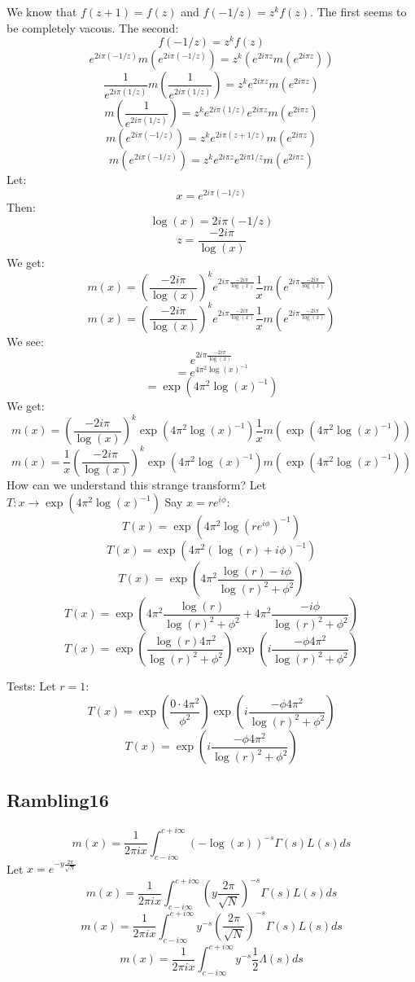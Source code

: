 \documentclass[a4paper]{amsart}
\begin{document}
We know that $f(z + 1) = f(z)$ and $f(-1/z) = z^kf(z)$. The first seems to be completely vacous. The second:
$$f(-1/z) = z^kf(z)$$
$$e^{2i\pi (-1/z)} m\left(e^{2i\pi (-1/z)}\right) = z^k(e^{2i\pi z} m(e^{2i\pi z}))$$
$$\frac{1}{e^{2i\pi (1/z)}} m\left(\frac{1}{e^{2i\pi (1/z)}}\right) = z^k e^{2i\pi z} m(e^{2i\pi z})$$
$$m\left(\frac{1}{e^{2i\pi (1/z)}}\right) = z^k e^{2i\pi (1/z)} e^{2i\pi z} m(e^{2i\pi z})$$
$$m\left(e^{2i\pi (-1/z)}\right) = z^k e^{2i\pi (z + 1/z)} m(e^{2i\pi z})$$
$$m\left(e^{2i\pi (-1/z)}\right) = z^k e^{2i\pi z} e^{2i\pi 1/z} m(e^{2i\pi z})$$
Let:
$$x = e^{2i\pi (-1/z)}$$
Then:
$$\log(x) = 2i\pi (-1/z)$$
$$z = \frac{-2i\pi}{\log(x)}$$
We get:
$$m(x) = \left(\frac{-2i\pi}{\log(x)}\right)^k e^{2i\pi \frac{-2i\pi}{\log(x)}} \frac{1}{x} m\left(e^{2i\pi \frac{-2i\pi}{\log(x)}}\right)$$
$$m(x) = \left(\frac{-2i\pi}{\log(x)}\right)^k e^{2i\pi \frac{-2i\pi}{\log(x)}} \frac{1}{x} m\left(e^{2i\pi \frac{-2i\pi}{\log(x)}}\right)$$
We see:
$$e^{2i\pi \frac{-2i\pi}{\log(x)}}$$
$$ = e^{4\pi^2 \log(x)^{-1}}$$
$$ = \exp(4\pi^2 \log(x)^{-1})$$
We get:
$$m(x) = \left(\frac{-2i\pi}{\log(x)}\right)^k \exp(4\pi^2 \log(x)^{-1}) \frac{1}{x} m\left(\exp(4\pi^2 \log(x)^{-1})\right)$$
$$m(x) = \frac{1}{x} \left(\frac{-2i\pi}{\log(x)}\right)^k \exp(4\pi^2 \log(x)^{-1}) m\left(\exp(4\pi^2 \log(x)^{-1})\right)$$
How can we understand this strange transform?
Let $T : x \to \exp(4\pi^2 \log(x)^{-1})$
Say $x = re^{i\phi}$:
$$T(x) = \exp(4\pi^2 \log(re^{i\phi})^{-1})$$
$$T(x) = \exp(4\pi^2 (\log(r) + i\phi)^{-1})$$
$$T(x) = \exp(4\pi^2 \frac{\log(r) - i\phi}{\log(r)^2 + \phi^2})$$
$$T(x) = \exp(4\pi^2 \frac{\log(r)}{\log(r)^2 + \phi^2} + 4\pi^2 \frac{-i\phi}{\log(r)^2 + \phi^2})$$
$$T(x) = \exp(\frac{\log(r)4\pi^2}{\log(r)^2 + \phi^2}) \exp(i\frac{-\phi4\pi^2}{\log(r)^2 + \phi^2})$$

Tests:
Let $r = 1$:
$$T(x) = \exp(\frac{0\cdot 4\pi^2}{\phi^2}) \exp(i\frac{-\phi4\pi^2}{\log(r)^2 + \phi^2})$$
$$T(x) = \exp(i\frac{-\phi4\pi^2}{\log(r)^2 + \phi^2})$$

\subsection{Rambling16}
$$m(x) = \frac{1}{2\pi i x} \int_{c - i\infty}^{c + i\infty}(-\log(x))^{-s} \Gamma(s)L(s)ds$$
Let $x = e^{-y\frac{2\pi}{\sqrt{N}}}$
$$m(x) = \frac{1}{2\pi i x} \int_{c - i\infty}^{c + i\infty} \left(y\frac{2\pi}{\sqrt{N}}\right)^{-s} \Gamma(s)L(s)ds$$
$$m(x) = \frac{1}{2\pi i x} \int_{c - i\infty}^{c + i\infty} y^{-s}\left(\frac{2\pi}{\sqrt{N}}\right)^{-s} \Gamma(s)L(s)ds$$
$$m(x) = \frac{1}{2\pi i x} \int_{c - i\infty}^{c + i\infty} y^{-s}\frac{1}{2}\Lambda(s)ds$$
\end{document}
